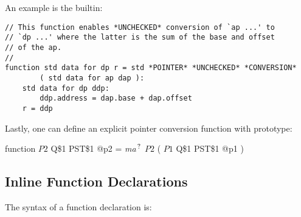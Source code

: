 \documentclass[12pt]{article}
\newcommand{\QMARK}{{$^{\,\mbox{\footnotesize ?}}$}}
\newenvironment{indpar}[1][0.3in]%
	{\begin{list}{}%
		     {\setlength{\itemsep}{0in}%
		      \setlength{\topsep}{0in}%
		      \setlength{\parsep}{1ex}%
		      \setlength{\labelwidth}{#1}%
		      \setlength{\leftmargin}{#1}%
		      \addtolength{\leftmargin}{\labelsep}}%
	 \item}%
	{\end{list}}
\begin{document}
An example is the builtin:
\begin{indpar}\begin{verbatim}
// This function enables *UNCHECKED* conversion of `ap ...' to
// `dp ...' where the latter is the sum of the base and offset
// of the ap.
//
function std data for dp r = std *POINTER* *UNCHECKED* *CONVERSION*
        ( std data for ap dap ):
    std data for dp ddp:
        ddp.address = dap.base + dap.offset
    r = ddp
\end{verbatim}\end{indpar}

Lastly, one can define an explicit pointer conversion function with
prototype:
\begin{indpar}
function $P2$ Q\$1 PST\$1 @p2 = {\em ma}\QMARK{} $P2$ ( $P1$ Q\$1 PST\$1 @p1 )
\end{indpar}

\subsection{Inline Function Declarations}
\label{INLINE-FUNCTION-DECLARATIONS}

The syntax of a function declaration is:
\end{document}
